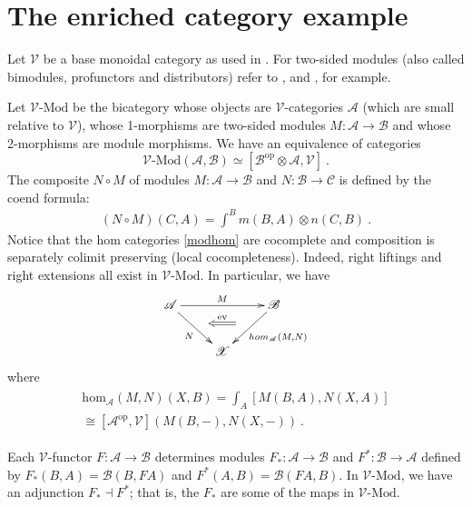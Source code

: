 \documentclass[a4paper,12pt]{article}
\theoremstyle{definition}
\theoremstyle{fact}
\theoremstyle{genquest}
\theoremstyle{step}
\newcommand{\lra}{\longrightarrow}
\def\CA{{\mathscr A}}
\def\CB{{\mathscr B}}
\def\CC{{\mathscr C}}
\def\CV{{\mathscr V}}
\def\CX{{\mathscr X}}
\begin{document}
{\section{The enriched category example}

Let $\CV$ be a base monoidal category as used in \cite{KellyBook}. 
For two-sided modules (also called bimodules, profunctors and distributors) refer to 
\cite{LawMetric}, \cite{CCEC} and \cite{MbHa}, for example.
  
Let $\CV\text{-}\mathrm{Mod}$ be the bicategory whose objects are $\CV$-categories $\CA$ 
(which are small relative to $\CV$),
whose 1-morphisms are two-sided modules $M : \CA \lra \CB$  
and whose 2-morphisms are module morphisms.
We have an equivalence of categories 
\begin{equation}\label{modhom}
\CV\text{-}\mathrm{Mod}(\CA,\CB)\simeq [\CB^{\mathrm{op}}\otimes \CA,\CV] \ .
\end{equation}
The composite $N\circ M$ of modules $M : \CA \lra \CB$ and $N : \CB \lra \CC$
is defined by the coend formula:
\begin{eqnarray}
(N\circ M)(C,A)=\int^{B}{m(B,A)\otimes n(C,B)} \ .
\end{eqnarray}
Notice that the hom categories \eqref{modhom} are cocomplete and composition is 
separately colimit preserving (local cocompleteness). 
Indeed, right liftings and right extensions all exist in
$\CV\text{-}\mathrm{Mod}$. In particular, we have
\begin{equation}\label{maintrianglemod}
\begin{aligned}
\xymatrix{
\CA \ar[rd]_{N}^(0.5){\phantom{a}}="1" \ar[rr]^{M}  && \CB \ar[ld]^{hom_{\CA}(M,N)}_(0.5){\phantom{a}}="2" \ar@{<=}"1";"2"^-{\mathrm{ev}}
\\
& \CX 
}
\end{aligned}
\end{equation}
where
\begin{eqnarray}
\begin{aligned}
\mathrm{hom}_{\CA}(M,N)(X,B) = \int_{A}{[M(B,A),N(X,A)]} \\
\cong [\CA^{\mathrm{op}},\CV](M(B,-),N(X,-)) \ .
\end{aligned}
\end{eqnarray}

Each $\CV$-functor $F : \CA \lra \CB$ determines modules $F_* : \CA \lra \CB$
and $F^* : \CB \lra \CA$ defined by $F_*(B,A)= \CB(B,FA)$ and $F^*(A,B)= \CB(FA,B)$.
In $\CV\text{-}\mathrm{Mod}$, we have an adjunction $F_* \dashv F^*$; that is, the $F_*$
are some of the maps in $\CV\text{-}\mathrm{Mod}$.    

}
\end{document}
